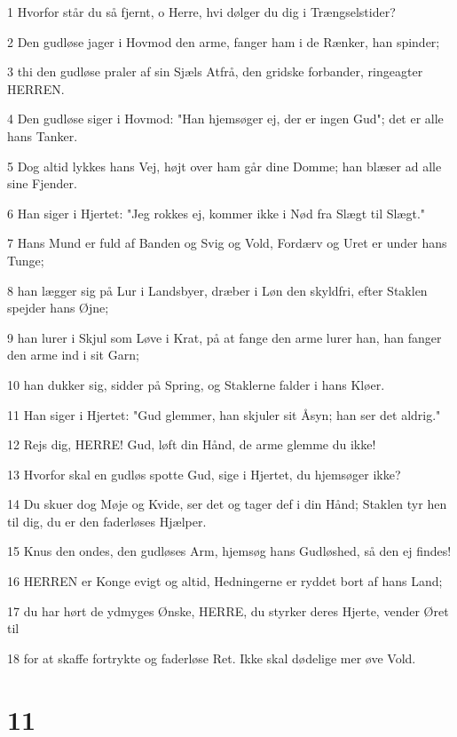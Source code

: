 \par 1 Hvorfor står du så fjernt, o Herre, hvi dølger du dig i Trængselstider?
\par 2 Den gudløse jager i Hovmod den arme, fanger ham i de Rænker, han spinder;
\par 3 thi den gudløse praler af sin Sjæls Atfrå, den gridske forbander, ringeagter HERREN.
\par 4 Den gudløse siger i Hovmod: "Han hjemsøger ej, der er ingen Gud"; det er alle hans Tanker.
\par 5 Dog altid lykkes hans Vej, højt over ham går dine Domme; han blæser ad alle sine Fjender.
\par 6 Han siger i Hjertet: "Jeg rokkes ej, kommer ikke i Nød fra Slægt til Slægt."
\par 7 Hans Mund er fuld af Banden og Svig og Vold, Fordærv og Uret er under hans Tunge;
\par 8 han lægger sig på Lur i Landsbyer, dræber i Løn den skyldfri, efter Staklen spejder hans Øjne;
\par 9 han lurer i Skjul som Løve i Krat, på at fange den arme lurer han, han fanger den arme ind i sit Garn;
\par 10 han dukker sig, sidder på Spring, og Staklerne falder i hans Kløer.
\par 11 Han siger i Hjertet: "Gud glemmer, han skjuler sit Åsyn; han ser det aldrig."
\par 12 Rejs dig, HERRE! Gud, løft din Hånd, de arme glemme du ikke!
\par 13 Hvorfor skal en gudløs spotte Gud, sige i Hjertet, du hjemsøger ikke?
\par 14 Du skuer dog Møje og Kvide, ser det og tager def i din Hånd; Staklen tyr hen til dig, du er den faderløses Hjælper.
\par 15 Knus den ondes, den gudløses Arm, hjemsøg hans Gudløshed, så den ej findes!
\par 16 HERREN er Konge evigt og altid, Hedningerne er ryddet bort af hans Land;
\par 17 du har hørt de ydmyges Ønske, HERRE, du styrker deres Hjerte, vender Øret til
\par 18 for at skaffe fortrykte og faderløse Ret. Ikke skal dødelige mer øve Vold.

\chapter{11}

